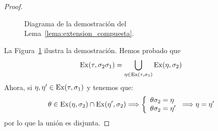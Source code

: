 \begin{lema}
\begin{proof}
\begin{figure}[ht]
            \centering
            \caption{Diagrama de la demostración del Lema~\ref{lema:extension_compuesta}.}
            \label{fig:extension_compuesta}
        \end{figure}

        La Figura~\ref{fig:extension_compuesta} ilustra la demostración. Hemos probado que
        \begin{equation*}
            \operatorname{Ex}(\tau,\sigma_2\sigma_1) = \bigcup_{\eta \in \operatorname{Ex}(\tau,\sigma_1)} \operatorname{Ex}(\eta,\sigma_2)
        \end{equation*}
        Ahora, si $\eta,\eta'\in \operatorname{Ex}(\tau,\sigma_1)$ y tenemos que:
        \begin{equation*}
            \theta \in  \operatorname{Ex}(\eta,\sigma_2)\cap \operatorname{Ex}(\eta',\sigma_2) \Longrightarrow \left\{\begin{array}{l}
                \theta\sigma_2 = \eta \\
                \theta \sigma_2 = \eta'
            \end{array}\right. \Longrightarrow \eta = \eta'
        \end{equation*}
        por lo que la unión es disjunta.
    \end{proof}
\end{lema}

